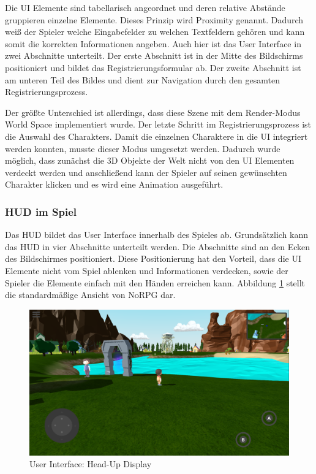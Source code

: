 				Die \ac{UI} Elemente sind tabellarisch angeordnet und deren relative Abstände gruppieren einzelne Elemente. Dieses Prinzip wird Proximity genannt. Dadurch weiß der Spieler welche Eingabefelder zu welchen Textfeldern gehören und kann somit die korrekten Informationen angeben. Auch hier ist das User Interface in zwei Abschnitte unterteilt. Der erste Abschnitt ist in der Mitte des Bildschirms positioniert und bildet das Registrierungsformular ab. Der zweite Abschnitt ist am unteren Teil des Bildes und dient zur Navigation durch den gesamten Registrierungsprozess.

				Der größte Unterschied ist allerdings, dass diese Szene mit dem Render-Modus World Space implementiert wurde. Der letzte Schritt im Registrierungsprozess ist die Auswahl des Charakters. Damit die einzelnen Charaktere in die \ac{UI} integriert werden konnten, musste dieser Modus umgesetzt werden. Dadurch wurde möglich, dass zunächst die 3D Objekte der Welt nicht von den \ac{UI} Elementen verdeckt werden und anschließend kann der Spieler auf seinen gewünschten Charakter klicken und es wird eine Animation ausgeführt. 

			\subsubsection{\acl{HUD} im Spiel}
				Das \ac{HUD} bildet das User Interface innerhalb des Spieles ab. Grundsätzlich kann das \ac{HUD} in vier Abschnitte unterteilt werden. Die Abschnitte sind an den Ecken des Bildschirmes positioniert. Diese Positionierung hat den Vorteil, dass die \ac{UI} Elemente nicht vom Spiel ablenken und Informationen verdecken, sowie der Spieler die Elemente einfach mit den Händen erreichen kann. Abbildung \ref{alwaysOnUI} stellt die standardmäßige Ansicht von NoRPG dar.

				\begin{figure}[htbp]
					\centering 
					\label{alwaysOnUI}
					\includegraphics[width=13cm]{pics/alwaysOnUI.png}
					\caption{User Interface: Head-Up Display}
				\end{figure}

